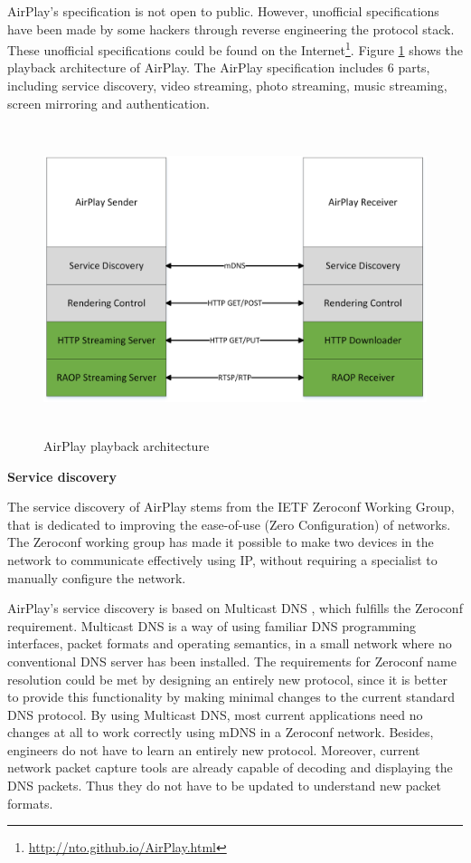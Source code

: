 AirPlay's specification is not open to public. However, unofficial
specifications have been made by some hackers through reverse engineering the
protocol stack. These unofficial specifications could be found on the
Internet\footnote{\url{http://nto.github.io/AirPlay.html}}.
Figure \ref{airplay_use_scenario} shows the playback architecture
of AirPlay. The AirPlay specification includes 6 parts, including service discovery, video
streaming, photo streaming, music streaming, screen mirroring and
authentication.
\clearpage
\begin{figure}[htb] 
\centering \includegraphics[height=9cm]{charts/airplay} 
\caption{AirPlay playback architecture\label{airplay_use_scenario}} 
\end{figure}  
\textbf{Service discovery}

The service discovery of AirPlay stems from the IETF Zeroconf Working Group, 
that is dedicated to improving the ease-of-use (Zero Configuration) of networks.
The Zeroconf working group has made it possible to make two devices in the 
network to communicate effectively using IP, without requiring a specialist to manually 
configure the network.

AirPlay's service discovery is based on Multicast DNS \cite{multicastdns}, which fulfills the
Zeroconf requirement. Multicast DNS is a way of using familiar DNS programming interfaces, packet formats and operating semantics, in a small 
network where no conventional DNS server has been installed. The requirements 
for Zeroconf name resolution could be met by designing an entirely new 
protocol, since it is better to provide this functionality by making minimal changes 
to the current standard DNS protocol. By using Multicast DNS, most current 
applications need no changes at all to work correctly using mDNS in a Zeroconf network. Besides,
engineers do not have to learn an entirely new protocol. Moreover, current network 
packet capture tools are already capable of  decoding and displaying the DNS packets. Thus they do not 
have to be updated to understand new packet formats.

